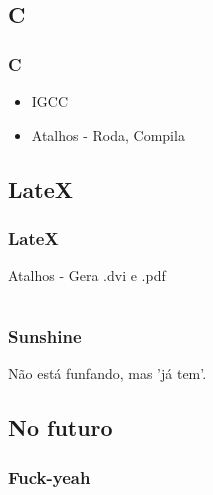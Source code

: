 \documentclass[]{beamer}
\begin{document}
\subsection{C}

\begin{frame}
    \frametitle{C}
    \begin{itemize}
        \item<1-> IGCC
        \item<2-> Atalhos - Roda, Compila
    \end{itemize}
\end{frame}

\subsection{LateX}

\begin{frame}
    \frametitle{LateX}
        Atalhos -  Gera .dvi e .pdf
\end{frame}


\section[Sunshine]{}
\begin{frame}
    \frametitle{Sunshine}
        Não está funfando, mas 'já tem'.
\end{frame}

\subsection{No futuro}

\begin{frame}
    \frametitle{Fuck-yeah}
    \begin{center}
    \end{center}
\end{frame}
\end{document}

